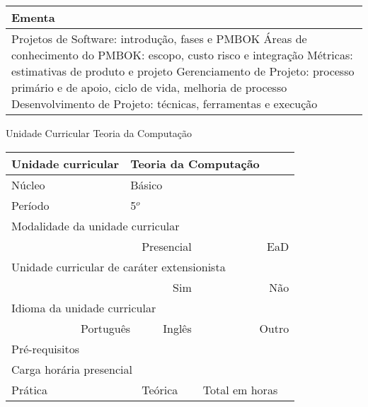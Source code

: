 \begin{quadro}[ht!]
\begin{tabular}{|p{3cm} p{2cm} p{3cm} p{2cm} p{3cm} p{2cm}|}
\multicolumn{6}{|p{15cm}|}{\cellcolor{blue1} Ementa} \\\hline
\hline\multicolumn{6}{|p{15cm}|}{\scriptsize Projetos de Software: introdução, fases e PMBOK Áreas de conhecimento do PMBOK: escopo, custo risco e integração Métricas: estimativas de produto e projeto Gerenciamento de Projeto: processo primário e de apoio, ciclo de vida, melhoria de processo Desenvolvimento de Projeto: técnicas, ferramentas e execução}\\\hline 
\hline
	\end{tabular}
\end{quadro}


\begin{quadro}[ht!]
  \centering\scriptsize
\caption{Unidade Curricular Teoria da Computação}
\label{unit_26}
\begin{tabular}{|p{3cm} p{2cm} p{3cm} p{2cm} p{3cm} p{2cm}|}\hline
\multicolumn{1}{|p{3cm}|}{\cellcolor{blue1} Unidade curricular} & \multicolumn{5}{p{9cm}|}{Teoria da Computação}\\\hline
\multicolumn{1}{|p{3cm}|}{\cellcolor{blue1} Núcleo} & \multicolumn{5}{p{11.5cm}|}{Básico}\\\hline
\multicolumn{1}{|p{3cm}|}{\cellcolor{blue1} Período} & \multicolumn{5}{p{9cm}|}{5$^o$}\\\hline
\multicolumn{6}{|p{15cm}|}{\cellcolor{blue1} Modalidade da unidade curricular} \\\hline
\multicolumn{2}{|r}{		} &  \multicolumn{2}{r}{Presencial \XBox} & \multicolumn{2}{r|}{EaD \Square	} \\\hline
\multicolumn{6}{|p{15cm}|}{\cellcolor{blue1} Unidade curricular de caráter extensionista} \\\hline
\multicolumn{4}{|r}{			Sim \Square	} & \multicolumn{2}{r|}{	Não \XBox	}\\\hline
\multicolumn{6}{|p{15cm}|}{\cellcolor{blue1} Idioma da unidade curricular} \\ \hline
\multicolumn{2}{|r}{	Português \XBox	} &  \multicolumn{2}{r}{	Inglês \Square	} & \multicolumn{2}{r|}{	Outro \Square	} \\ \hline
\multicolumn{1}{|p{3cm}|}{\cellcolor{blue1} Pré-requisitos} & \multicolumn{5}{p{9cm}|}{}\\ \hline
\multicolumn{6}{|p{15cm}|}{\cellcolor{blue1} Carga horária presencial} \\ \hline
\multicolumn{1}{|p{3cm}|}{\raggedleft Prática} & \multicolumn{1}{p{1cm}|}{\centering	30	} &  \multicolumn{1}{p{3cm}|}{\raggedleft Teórica}  & \multicolumn{1}{p{1cm}|}{\centering 	30	} & \multicolumn{1}{p{3cm}|}{\raggedleft Total em horas} & \multicolumn{1}{p{1cm}|}{\raggedleft	60	} \\ \hline 

\end{tabular}
\end{quadro}

